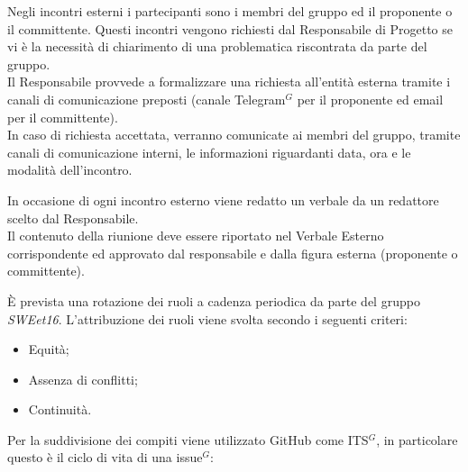 
            Negli incontri esterni i partecipanti sono i membri del gruppo ed il proponente o il committente.
            Questi incontri vengono richiesti dal Responsabile di Progetto se vi è la necessità di chiarimento di una problematica riscontrata da parte del gruppo.     \\
            Il Responsabile provvede a formalizzare una richiesta all'entità esterna tramite i canali di comunicazione preposti (canale Telegram$^{G}$ per il proponente ed email per il committente).\\

            In caso di richiesta accettata, verranno comunicate ai membri del gruppo, tramite canali di comunicazione interni, le informazioni riguardanti data, ora e le modalità dell'incontro.

            In occasione di ogni incontro esterno viene redatto un verbale da un redattore scelto dal Responsabile.  \\
            Il contenuto della riunione deve essere riportato nel Verbale Esterno corrispondente ed approvato dal responsabile e dalla figura esterna (proponente o committente).


        È prevista una rotazione dei ruoli a cadenza periodica da parte del gruppo \textit{SWEet16}.
        L'attribuzione dei ruoli viene svolta secondo i seguenti criteri:
        \begin{itemize}
            \item Equità;
            \item Assenza di conflitti;
            \item Continuità.
        \end{itemize}


        Per la suddivisione dei compiti viene utilizzato GitHub come ITS$^{G}$, in particolare questo è il ciclo di vita di una issue$^{G}$:

